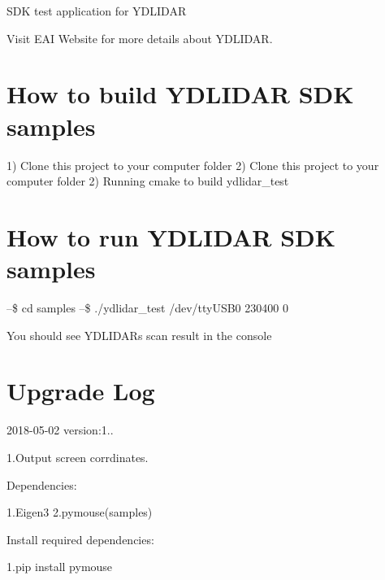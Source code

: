 S\+DK test application for Y\+D\+L\+I\+D\+AR

Visit E\+AI Website for more details about Y\+D\+L\+I\+D\+AR.

\section*{How to build Y\+D\+L\+I\+D\+AR S\+DK samples }

1) Clone this project to your computer folder 2) Clone this project to your computer folder 2) Running cmake to build ydlidar\+\_\+test

\section*{How to run Y\+D\+L\+I\+D\+AR S\+DK samples }

--\$ cd samples --\$ ./ydlidar\+\_\+test /dev/tty\+U\+S\+B0 230400 0

You should see Y\+D\+L\+I\+D\+AR\textquotesingle{}s scan result in the console

\section*{Upgrade Log }

2018-\/05-\/02 version\+:1..

1.\+Output screen corrdinates.

Dependencies\+:

1.\+Eigen3 2.\+pymouse(samples)

Install required dependencies\+:

1.\+pip install pymouse 